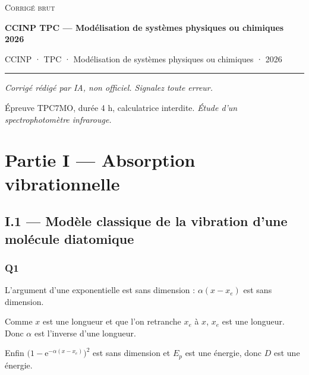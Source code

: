 \documentclass[11pt,a4paper]{article}
\newcommand{\equationajustee}[1]{%
  \sbox{\boiteequation}{$\displaystyle #1$}%
  \ifdim\wd\boiteequation>\linewidth
    \[\resizebox{\linewidth}{!}{\usebox{\boiteequation}}\]%
  \else
    \[#1\]%
  \fi}
\begin{document}
\thispagestyle{plain}
\begin{center}
  {\small\scshape Corrigé brut}\par\smallskip
  {\LARGE\bfseries CCINP TPC — Modélisation de systèmes physiques ou chimiques 2026\par}\medskip
  {\large CCINP · TPC · Modélisation de systèmes physiques ou chimiques · 2026\par}
\end{center}
\vspace{2pt}\hrule\vspace{8pt}

\emph{Corrigé rédigé par IA, non officiel. Signalez toute erreur.}

Épreuve TPC7MO, durée 4 h, calculatrice interdite. \emph{Étude d'un spectrophotomètre infrarouge.}

\hypertarget{partie-i-absorption-vibrationnelle}{%
\section{Partie I --- Absorption vibrationnelle}\label{partie-i-absorption-vibrationnelle}}

\hypertarget{i.1-moduxe8le-classique-de-la-vibration-dune-moluxe9cule-diatomique}{%
\subsection{I.1 --- Modèle classique de la vibration d'une molécule diatomique}\label{i.1-moduxe8le-classique-de-la-vibration-dune-moluxe9cule-diatomique}}

\hypertarget{q1}{%
\subsubsection{Q1}\label{q1}}

L'argument d'une exponentielle est sans dimension : \(\alpha(x - x_e)\) est sans dimension.

Comme \(x\) est une longueur et que l'on retranche \(x_e\) à \(x\), \(x_e\) est une longueur. Donc \(\alpha\) est l'inverse d'une longueur.

Enfin \(\bigl(1 - {\mathrm{e}}^{-\alpha(x-x_e)}\bigr)^2\) est sans dimension et \(E_p\) est une énergie, donc \(D\) est une énergie.

\equationajustee{\boxed{\begin{aligned}{}&D\ \text{en J}\ (\mathrm{kg\,m^2\,s^{-2}}) \\
&\alpha\ \text{en}\ \mathrm{m^{-1}} \\
&x_e\ \text{en m}
\end{aligned}}}
\end{document}
